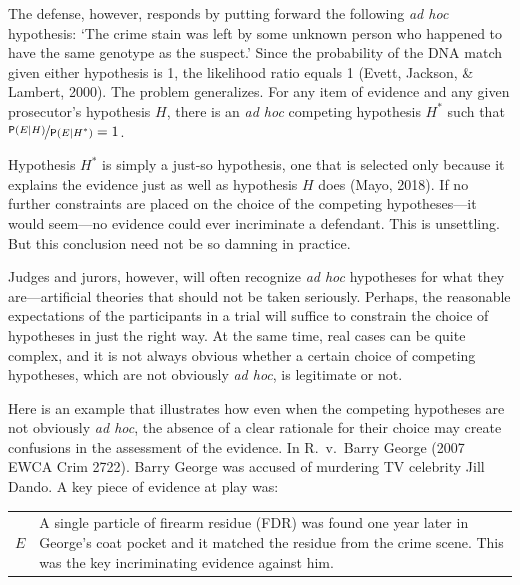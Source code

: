 \documentclass[10pt,dvipsnames,enabledeprecatedfontcommands]{scrartcl}
\newcommand{\pr}[1]{\mathsf{P}(#1)}
\begin{document}
The defense, however, responds by putting forward the following
\textit{ad hoc} hypothesis: `The crime stain was left by some unknown
person who happened to have the same genotype as the suspect.' Since the
probability of the DNA match given either hypothesis is 1, the
likelihood ratio equals 1 (Evett, Jackson, \& Lambert, 2000). The
problem generalizes. For any item of evidence and any given prosecutor's
hypothesis \(H\), there is an \textit{ad hoc} competing hypothesis
\(H^*\) such that \(\nicefrac{\pr{E \vert H}}{\pr{E \vert H^*}}=1\).

Hypothesis \(H^*\) is simply a just-so hypothesis, one that is selected
only because it explains the evidence just as well as hypothesis \(H\)
does (Mayo, 2018). If no further constraints are placed on the choice of
the competing hypotheses---it would seem---no evidence could ever
incriminate a defendant. This is unsettling. But this conclusion need
not be so damning in practice.


Judges and jurors, however, will often recognize \textit{ad hoc}
hypotheses for what they are---artificial theories that should not be
taken seriously. Perhaps, the reasonable expectations of the
participants in a trial will suffice to constrain the choice of
hypotheses in just the right way. At the same time, real cases can be
quite complex, and it is not always obvious whether a certain choice of
competing hypotheses, which are not obviously \textit{ad hoc}, is
legitimate or not.

Here is an example that illustrates how even when the competing
hypotheses are not obviously \textit{ad hoc}, the absence of a clear
rationale for their choice may create confusions in the assessment of
the evidence. In R.~v.~Barry George (2007 EWCA Crim 2722). Barry George
was accused of murdering TV celebrity Jill Dando. A key piece of
evidence at play was: \vspace{2mm}

\begin{center}
\begin{tabular}{lp{12cm}} 
    $E$ &  
    A single particle of firearm  residue (FDR) 
     was found one year later in George's coat pocket and it matched the residue from the crime scene.
     This was the key incriminating evidence against him. 
\end{tabular}
\end{center}
\end{document}
